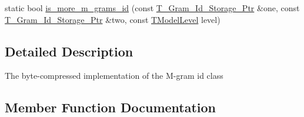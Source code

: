 \begin{DoxyCompactItemize}
\item 
static bool \hyperlink{structuva_1_1smt_1_1tries_1_1mgrams_1_1_byte___m___gram___id_a5c16c3a045aa25c4cec961095023a5ef}{is\+\_\+more\+\_\+m\+\_\+grams\+\_\+id} (const \hyperlink{namespaceuva_1_1smt_1_1tries_1_1mgrams_1_1_m___gram___id_a478e6468dbd5dab37599c566d77c845c}{T\+\_\+\+Gram\+\_\+\+Id\+\_\+\+Storage\+\_\+\+Ptr} \&one, const \hyperlink{namespaceuva_1_1smt_1_1tries_1_1mgrams_1_1_m___gram___id_a478e6468dbd5dab37599c566d77c845c}{T\+\_\+\+Gram\+\_\+\+Id\+\_\+\+Storage\+\_\+\+Ptr} \&two, const \hyperlink{namespaceuva_1_1smt_1_1tries_a20577a44b3a42d26524250634379b7cb}{T\+Model\+Level} level)
\end{DoxyCompactItemize}


\subsection{Detailed Description}
The byte-\/compressed implementation of the M-\/gram id class 

\subsection{Member Function Documentation}
\hypertarget{structuva_1_1smt_1_1tries_1_1mgrams_1_1_byte___m___gram___id_ae58b2b3de2e1cdadcaf09104cc90732a}{}

